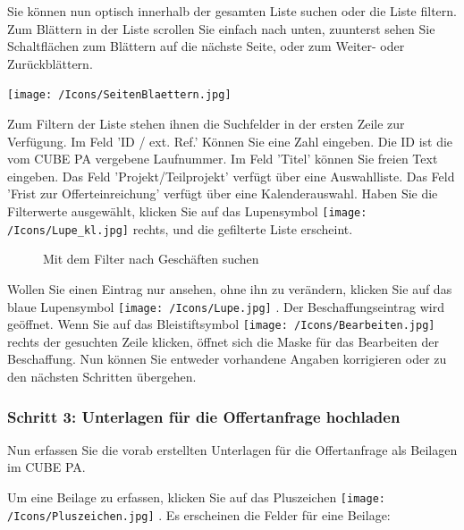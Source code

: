 \vspace{\baselineskip}

Sie können nun optisch innerhalb der gesamten Liste suchen oder die Liste filtern. Zum Blättern in der Liste scrollen Sie einfach nach unten, zuunterst sehen Sie Schaltflächen zum Blättern auf die nächste Seite, oder zum Weiter- oder Zurückblättern.

\begin{center}
\texttt{[image: /Icons/SeitenBlaettern.jpg]}
\end{center}

Zum Filtern der Liste stehen ihnen die Suchfelder in der ersten Zeile zur Verfügung. Im Feld 'ID / ext. Ref.' Können Sie eine Zahl eingeben. Die ID ist die vom CUBE PA vergebene Laufnummer. Im Feld 'Titel' können Sie freien Text eingeben. Das Feld 'Projekt/Teilprojekt' verfügt über eine Auswahlliste. Das Feld 'Frist zur Offerteinreichung' verfügt über eine Kalenderauswahl. Haben Sie die Filterwerte ausgewählt, klicken Sie auf das Lupensymbol \texttt{[image: /Icons/Lupe\_kl.jpg]}  rechts, und die gefilterte Liste erscheint.

\begin{figure}[H]
\caption{Mit dem Filter nach Geschäften suchen}
\end{figure}

Wollen Sie einen Eintrag nur ansehen, ohne ihn zu verändern, klicken Sie auf das blaue Lupensymbol \texttt{[image: /Icons/Lupe.jpg]} . Der Beschaffungseintrag wird geöffnet. Wenn Sie auf das Bleistiftsymbol \texttt{[image: /Icons/Bearbeiten.jpg]}  rechts der gesuchten Zeile klicken, öffnet sich die Maske für das Bearbeiten der Beschaffung.\textcolor{red}{ }Nun können Sie entweder vorhandene Angaben korrigieren oder zu den nächsten Schritten übergehen.

\subsubsection{Schritt 3: Unterlagen für die Offertanfrage hochladen}

Nun erfassen Sie die vorab erstellten Unterlagen für die Offertanfrage als Beilagen im CUBE PA.

\vspace{\baselineskip}

Um eine Beilage zu erfassen, klicken Sie auf das Pluszeichen \texttt{[image: /Icons/Pluszeichen.jpg]} . Es erscheinen die Felder für eine Beilage:

